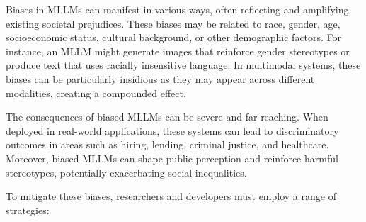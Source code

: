 Biases in MLLMs can manifest in various ways, often reflecting and amplifying existing societal prejudices. These biases may be related to race, gender, age, socioeconomic status, cultural background, or other demographic factors. For instance, an MLLM might generate images that reinforce gender stereotypes or produce text that uses racially insensitive language. In multimodal systems, these biases can be particularly insidious as they may appear across different modalities, creating a compounded effect.

The consequences of biased MLLMs can be severe and far-reaching. When deployed in real-world applications, these systems can lead to discriminatory outcomes in areas such as hiring, lending, criminal justice, and healthcare. Moreover, biased MLLMs can shape public perception and reinforce harmful stereotypes, potentially exacerbating social inequalities.

To mitigate these biases, researchers and developers must employ a range of strategies:

